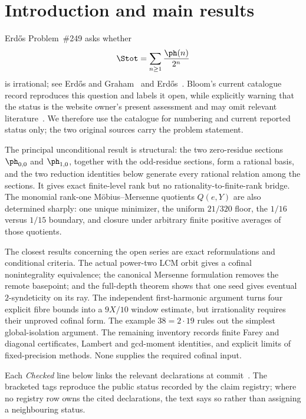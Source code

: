 \section{Introduction and main results}\label{sec:results}

Erd\H{o}s Problem~\#249 asks whether
\[
  \Stot=\sum_{n\ge1}\frac{\ph(n)}{2^n}
\]
is irrational; see Erd\H{o}s and Graham~\cite[p.~61]{erdosgraham1980} and
Erd\H{o}s~\cite[p.~102]{erdos1988}.  Bloom's current catalogue record
reproduces this question and labels it open, while explicitly warning that
the status is the website owner's present assessment and may omit relevant
literature~\cite{erdosproblems}.  We therefore use the catalogue for
numbering and current reported status only; the two original sources carry
the problem statement.

The principal unconditional result is structural: the two zero-residue
sections $\ph_{0,0}$ and $\ph_{1,0}$, together with the odd-residue sections,
form a rational basis, and the two reduction identities below generate every
rational relation among the sections.  It gives exact finite-level rank but
no rationality-to-finite-rank bridge.  The monomial rank-one M\"obius--Mersenne quotients $Q(e,Y)$ are also determined sharply: one unique minimizer, the uniform $21/320$ floor, the $1/16$ versus $1/15$ boundary, and closure under arbitrary finite positive averages of those quotients.

The closest results concerning the open series are exact reformulations and
conditional criteria.  The actual power-two LCM orbit gives a cofinal
nonintegrality equivalence; the canonical Mersenne formulation removes the
remote basepoint; and the full-depth theorem shows that one seed gives eventual
$2$-syndeticity on its ray.  The independent first-harmonic argument turns four
explicit fibre bounds into a $9X/10$ window estimate, but irrationality requires
their unproved cofinal form.  The example $38=2\cdot19$ rules out the simplest
global-isolation argument.  The remaining inventory records finite Farey and
diagonal certificates, Lambert and gcd-moment identities, and explicit limits
of fixed-precision methods.  None supplies the required cofinal input.

\statusboundary

Each \emph{Checked} line below links the relevant declarations at
commit~\texttt{\commitshort}.  The bracketed tags reproduce the public status
recorded by the claim registry; where no registry row owns the cited
declarations, the text says so rather than assigning a neighbouring status.

